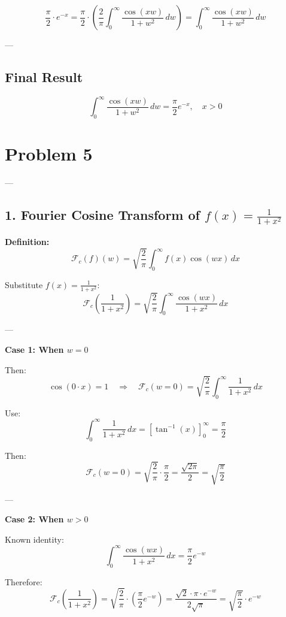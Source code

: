 \documentclass{article}
\begin{document}
\[
\frac{\pi}{2} \cdot e^{-x}
= \frac{\pi}{2} \cdot \left( \frac{2}{\pi} \int_0^\infty \frac{\cos(xw)}{1 + w^2} \, dw \right)
= \int_0^\infty \frac{\cos(xw)}{1 + w^2} \, dw
\]

---

\subsection*{Final Result}

\[
\boxed{
\int_0^\infty \frac{\cos(xw)}{1 + w^2} \, dw = \frac{\pi}{2} e^{-x}, \quad x > 0
}
\]

\newpage
\section*{Problem 5}

---

\subsection*{1. Fourier Cosine Transform of \( f(x) = \frac{1}{1 + x^2} \)}

\textbf{Definition:}
\[
\mathcal{F}_c(f)(w) = \sqrt{\frac{2}{\pi}} \int_0^\infty f(x) \cos(wx) \, dx
\]

Substitute \( f(x) = \frac{1}{1 + x^2} \):
\[
\mathcal{F}_c\left( \frac{1}{1 + x^2} \right) = \sqrt{\frac{2}{\pi}} \int_0^\infty \frac{\cos(wx)}{1 + x^2} \, dx
\]

---

\textbf{Case 1: When \( w = 0 \)}

Then:
\[
\cos(0 \cdot x) = 1 \quad \Rightarrow \quad \mathcal{F}_c(w = 0) = \sqrt{\frac{2}{\pi}} \int_0^\infty \frac{1}{1 + x^2} \, dx
\]

Use:
\[
\int_0^\infty \frac{1}{1 + x^2} \, dx = \left[ \tan^{-1}(x) \right]_0^\infty = \frac{\pi}{2}
\]

Then:
\[
\mathcal{F}_c(w = 0) = \sqrt{\frac{2}{\pi}} \cdot \frac{\pi}{2}
= \frac{\sqrt{2\pi}}{2}
= \boxed{ \sqrt{ \frac{\pi}{2} } }
\]

---

\textbf{Case 2: When \( w > 0 \)}

Known identity:
\[
\int_0^\infty \frac{\cos(wx)}{1 + x^2} \, dx = \frac{\pi}{2} e^{-w}
\]

Therefore:
\[
\mathcal{F}_c\left( \frac{1}{1 + x^2} \right)
= \sqrt{\frac{2}{\pi}} \cdot \left( \frac{\pi}{2} e^{-w} \right)
= \frac{\sqrt{2} \cdot \pi \cdot e^{-w}}{2\sqrt{\pi}}
= \boxed{ \sqrt{ \frac{\pi}{2} } \cdot e^{-w} }
\]
\end{document}
